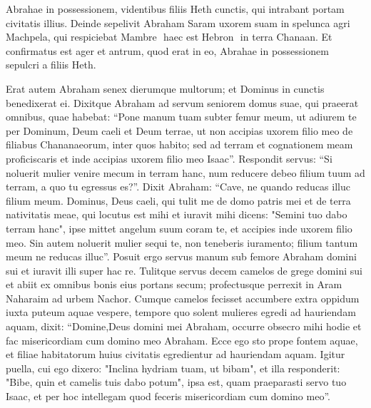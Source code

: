 \begin{biblechapter}
\begin{biblechapter}
\begin{biblechapter}
\begin{biblechapter}
\begin{biblechapter}
\begin{biblechapter}
\begin{biblechapter}
\begin{biblechapter}
\begin{biblechapter}
\begin{biblechapter}
\begin{biblechapter}
\begin{biblechapter}
\begin{biblechapter}
\begin{biblechapter}
\begin{biblechapter}
\begin{biblechapter}
\begin{biblechapter}
\begin{biblechapter}
\begin{biblechapter}
\begin{biblechapter}
\begin{biblechapter}
\begin{biblechapter}
\begin{biblechapter}
\verse Abrahae in possessionem, videntibus filiis Heth cunctis, qui intrabant portam civitatis illius. 
\verse Deinde sepelivit Abraham Saram uxorem suam in spelunca agri Machpela, qui respiciebat Mambre ­ haec est Hebron ­ in terra Chanaan. 
\verse Et confirmatus est ager et antrum, quod erat in eo, Abrahae in possessionem sepulcri a filiis Heth.
 
\begin{biblechapter}
\verse Erat autem Abraham senex dierumque multorum; et Dominus in cunctis benedixerat ei.
 \verse Dixitque Abraham ad servum seniorem domus suae, qui praeerat omnibus, quae habebat: “Pone manum tuam subter femur meum, 
\verse ut adiurem te per Dominum, Deum caeli et Deum terrae, ut non accipias uxorem filio meo de filiabus Chananaeorum, inter quos habito; 
\verse sed ad terram et cognationem meam proficiscaris et inde accipias uxorem filio meo Isaac”.
 \verse Respondit servus: “Si noluerit mulier venire mecum in terram hanc, num reducere debeo filium tuum ad terram, a quo tu egressus es?”. 
\verse Dixit Abraham: “Cave, ne quando reducas illuc filium meum. 
\verse Dominus, Deus caeli, qui tulit me de domo patris mei et de terra nativitatis meae, qui locutus est mihi et iuravit mihi dicens: "Semini tuo dabo terram hanc", ipse mittet angelum suum coram te, et accipies inde uxorem filio meo. 
\verse Sin autem noluerit mulier sequi te, non teneberis iuramento; filium tantum meum ne reducas illuc”. 
 \verse Posuit ergo servus manum sub femore Abraham domini sui et iuravit illi super hac re.
 \verse Tulitque servus decem camelos de grege domini sui et abiit ex omnibus bonis eius portans secum; profectusque perrexit in Aram Naharaim ad urbem Nachor.
 \verse Cumque camelos fecisset accumbere extra oppidum iuxta puteum aquae vespere, tempore quo solent mulieres egredi ad hauriendam aquam, dixit: 
\verse “Domine,Deus domini mei Abraham, occurre obsecro mihi hodie et fac misericordiam cum domino meo Abraham. 
\verse Ecce ego sto prope fontem aquae, et filiae habitatorum huius civitatis egredientur ad hauriendam aquam. 
\verse Igitur puella, cui ego dixero: "Inclina hydriam tuam, ut bibam", et illa responderit: "Bibe, quin et camelis tuis dabo potum", ipsa est, quam praeparasti servo tuo Isaac, et per hoc intellegam quod feceris misericordiam cum domino meo”.

\end{biblechapter}
\end{biblechapter}
\end{biblechapter}
\end{biblechapter}
\end{biblechapter}
\end{biblechapter}
\end{biblechapter}
\end{biblechapter}
\end{biblechapter}
\end{biblechapter}
\end{biblechapter}
\end{biblechapter}
\end{biblechapter}
\end{biblechapter}
\end{biblechapter}
\end{biblechapter}
\end{biblechapter}
\end{biblechapter}
\end{biblechapter}
\end{biblechapter}
\end{biblechapter}
\end{biblechapter}
\end{biblechapter}
\end{biblechapter}
